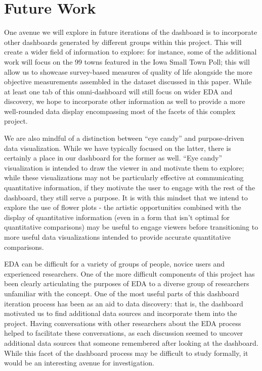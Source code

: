 \documentclass[print]{nuthesis}
\begin{document}
\section{ Future Work }

One avenue we will explore in future iterations of the dashboard is to incorporate other dashboards generated by different groups within this project. This will create a wider field of information to explore: for instance, some of the additional work will focus on the 99 towns featured in the Iowa Small Town Poll; this will allow us to showcase survey-based measures of quality of life alongside the more objective measurements assembled in the dataset discussed in this paper. While at least one tab of this omni-dashboard will still focus on wider EDA and discovery, we hope to incorporate other information as well to provide a more well-rounded data display encompassing most of the facets of this complex project.

We are also mindful of a distinction between ``eye candy'' and purpose-driven data visualization. While we have typically focused on the latter, there is certainly a place in our dashboard for the former as well. ``Eye candy'' visualization is intended to draw the viewer in and motivate them to explore; while these visualizations may not be particularly effective at communicating quantitative information, if they motivate the user to engage with the rest of the dashboard, they still serve a purpose. It is with this mindset that we intend to explore the use of flower plots - the artistic opportunities combined with the display of quantitative information (even in a form that isn't optimal for quantitative comparisons) may be useful to engage viewers before transitioning to more useful data visualizations intended to provide accurate quantitative comparisons.

EDA can be difficult for a variety of groups of people, novice users and experienced researchers. One of the more difficult components of this project has been clearly articulating the purposes of EDA to a diverse group of researchers unfamiliar with the concept. One of the most useful parts of this dashboard iteration process has been as an aid to data discovery: that is, the dashboard motivated us to find additional data sources and incorporate them into the project. Having conversations with other researchers about the EDA process helped to facilitate these conversations, as each discussion seemed to uncover additional data sources that someone remembered after looking at the dashboard. While this facet of the dashboard process may be difficult to study formally, it would be an interesting avenue for investigation.
\end{document}
